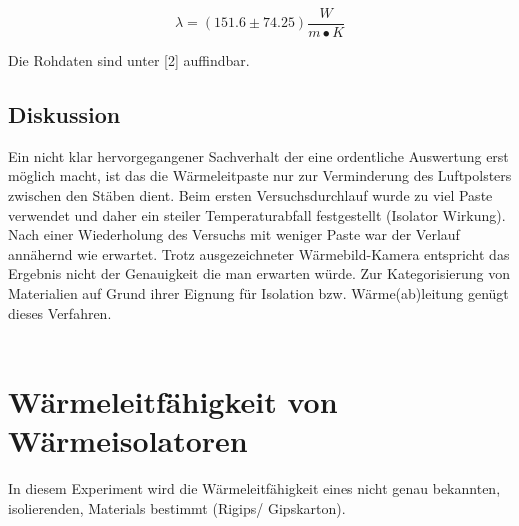 \documentclass[12pt,a4paper]{article}
\begin{document}
\begin{multicols}{2}
$$\lambda = ( 151.6 \pm 74.25)\frac{W}{m•K}$$

Die Rohdaten sind unter [2] auffindbar.

\subsection{Diskussion}
Ein nicht klar hervorgegangener Sachverhalt der eine ordentliche Auswertung erst möglich macht, ist das die Wärmeleitpaste nur zur Verminderung des Luftpolsters zwischen den Stäben dient. Beim ersten Versuchsdurchlauf wurde zu viel Paste verwendet und daher ein steiler Temperaturabfall festgestellt (Isolator Wirkung). Nach einer Wiederholung des Versuchs mit weniger Paste war der Verlauf annähernd wie erwartet. Trotz ausgezeichneter Wärmebild-Kamera entspricht das Ergebnis nicht der Genauigkeit die man erwarten würde. Zur Kategorisierung von Materialien auf Grund ihrer Eignung für Isolation bzw. Wärme(ab)leitung genügt dieses Verfahren.\\
\\



\section{Wärmeleitfähigkeit von Wärmeisolatoren}
In diesem Experiment wird die Wärmeleitfähigkeit eines nicht genau bekannten, isolierenden, Materials bestimmt (Rigips/ Gipskarton).


\end{multicols}
\end{document}
